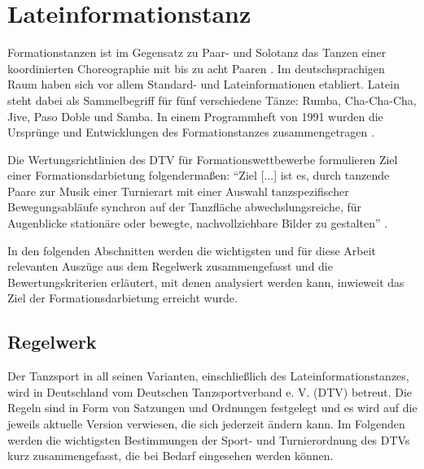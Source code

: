 \documentclass[
  ngerman,
  a4paper,  %
  twoside,  %
  bibliography=totoc,
  headsepline,
  cleardoublepage=empty,
  parskip=half,
  draft=false
]{scrbook}
\begin{document}
\section{Lateinformationstanz}
Formationstanzen ist im Gegensatz zu Paar- und Solotanz das Tanzen einer koordinierten Choreographie mit bis zu acht Paaren \cite{beck_visual_2023}.
Im deutschsprachigen Raum haben sich vor allem Standard- und Lateinformationen etabliert.
Latein steht dabei als Sammelbegriff für fünf verschiedene Tänze: Rumba, Cha-Cha-Cha, Jive, Paso Doble und Samba. In einem Programmheft von 1991 wurden die Ursprünge und Entwicklungen des Formationstanzes zusammengetragen \cite{formation_geschichte}.


Die Wertungsrichtlinien des DTV für Formationswettbewerbe formulieren Ziel einer Formationsdarbietung folgendermaßen:
\enquote{Ziel [...] ist es, durch tanzende Paare zur Musik einer Turnierart mit einer
  Auswahl tanzspezifischer Bewegungsabläufe synchron auf der Tanzfläche abwechslungsreiche, für
  Augenblicke stationäre oder bewegte, nachvollziehbare Bilder zu gestalten} \cite{wertungsrichtlinien}.

In den folgenden Abschnitten werden die wichtigsten und für diese Arbeit relevanten Auszüge aus dem Regelwerk zusammengefasst und die Bewertungskriterien erläutert, mit denen analysiert werden kann, inwieweit das Ziel der Formationsdarbietung erreicht wurde.




\subsection{Regelwerk}
Der Tanzsport in all seinen Varianten, einschließlich des Lateinformationstanzes, wird in Deutschland vom Deutschen Tanzsportverband e. V. (DTV) betreut.
Die Regeln sind in Form von Satzungen und Ordnungen festgelegt \cite{noauthor_tanzsport_nodate} und es wird auf die jeweils aktuelle Version verwiesen, die sich jederzeit ändern kann.
Im Folgenden werden die wichtigsten Bestimmungen der Sport- und Turnierordnung des DTVs kurz zusammengefasst, die bei Bedarf eingesehen werden können.
\end{document}
